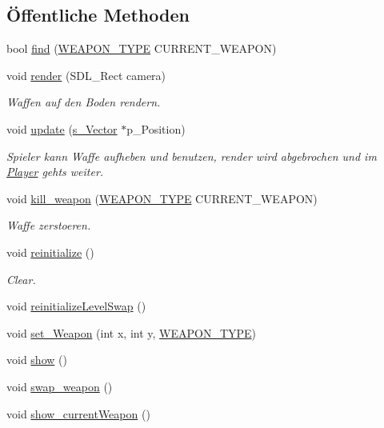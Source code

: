 \subsection*{Öffentliche Methoden}
\begin{DoxyCompactItemize}
\item 
bool \hyperlink{class_weapon_manager_ae2371fd70863bc0e51362b9798190c30}{find} (\hyperlink{globals_8h_adee3cd4bc0db6b52507cfc49432856f2}{W\-E\-A\-P\-O\-N\-\_\-\-T\-Y\-P\-E} C\-U\-R\-R\-E\-N\-T\-\_\-\-W\-E\-A\-P\-O\-N)
\item 
void \hyperlink{class_weapon_manager_acb9216f61525ede5ed970b5d558db9e9}{render} (S\-D\-L\-\_\-\-Rect camera)
\begin{DoxyCompactList}\small\item\em Waffen auf den Boden rendern. \end{DoxyCompactList}\item 
void \hyperlink{class_weapon_manager_a59cc9e0d6cb21105cf00ac419ea2a573}{update} (\hyperlink{structs___vector}{s\-\_\-\-Vector} $\ast$p\-\_\-\-Position)
\begin{DoxyCompactList}\small\item\em Spieler kann Waffe aufheben und benutzen, render wird abgebrochen und im \hyperlink{class_player}{Player} gehts weiter. \end{DoxyCompactList}\item 
void \hyperlink{class_weapon_manager_a82c763fa5b480335c46a6675cd25f9e5}{kill\-\_\-weapon} (\hyperlink{globals_8h_adee3cd4bc0db6b52507cfc49432856f2}{W\-E\-A\-P\-O\-N\-\_\-\-T\-Y\-P\-E} C\-U\-R\-R\-E\-N\-T\-\_\-\-W\-E\-A\-P\-O\-N)
\begin{DoxyCompactList}\small\item\em Waffe zerstoeren. \end{DoxyCompactList}\item 
void \hyperlink{class_weapon_manager_a8d7e4a4638847ef3c39323a37dddd616}{reinitialize} ()
\begin{DoxyCompactList}\small\item\em Clear. \end{DoxyCompactList}\item 
void \hyperlink{class_weapon_manager_a664a807d1f7599532affec338b3a868a}{reinitialize\-Level\-Swap} ()
\item 
void \hyperlink{class_weapon_manager_a6213a907c477df0f032ac4ebc8dd810d}{set\-\_\-\-Weapon} (int x, int y, \hyperlink{globals_8h_adee3cd4bc0db6b52507cfc49432856f2}{W\-E\-A\-P\-O\-N\-\_\-\-T\-Y\-P\-E})
\item 
void \hyperlink{class_weapon_manager_ab9c945db9e377562d05493f9474ec499}{show} ()
\item 
void \hyperlink{class_weapon_manager_ad2d37307f38fc2ae493d0ee804c9842f}{swap\-\_\-weapon} ()
\item 
void \hyperlink{class_weapon_manager_a815b728b877f0f1fefceec97c1a6a7e9}{show\-\_\-current\-Weapon} ()
\end{DoxyCompactItemize}
